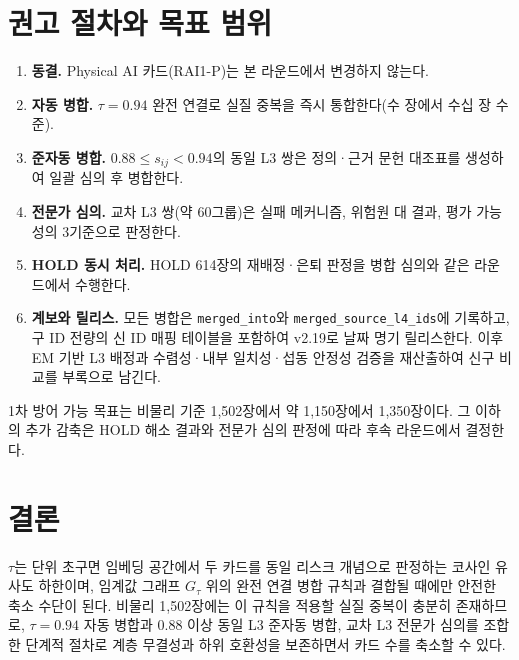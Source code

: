 \documentclass[11pt,a4paper]{article}
\begin{document}
\section{권고 절차와 목표 범위}

\begin{enumerate}
\item \textbf{동결.} Physical AI 카드(RAI1-P)는 본 라운드에서 변경하지 않는다.
\item \textbf{자동 병합.} $\tau=0.94$ 완전 연결로 실질 중복을 즉시 통합한다(수 장에서 수십 장 수준).
\item \textbf{준자동 병합.} $0.88 \leq s_{ij} < 0.94$의 동일 L3 쌍은 정의·근거 문헌 대조표를 생성하여 일괄 심의 후 병합한다.
\item \textbf{전문가 심의.} 교차 L3 쌍(약 60그룹)은 실패 메커니즘, 위험원 대 결과, 평가 가능성의 3기준으로 판정한다.
\item \textbf{HOLD 동시 처리.} HOLD 614장의 재배정·은퇴 판정을 병합 심의와 같은 라운드에서 수행한다.
\item \textbf{계보와 릴리스.} 모든 병합은 \texttt{merged\_into}와 \texttt{merged\_source\_l4\_ids}에 기록하고, 구 ID 전량의 신 ID 매핑 테이블을 포함하여 v2.19로 날짜 명기 릴리스한다. 이후 EM 기반 L3 배정과 수렴성·내부 일치성·섭동 안정성 검증을 재산출하여 신구 비교를 부록으로 남긴다.
\end{enumerate}

1차 방어 가능 목표는 비물리 기준 1{,}502장에서 약 1{,}150장에서 1{,}350장이다. 그 이하의 추가 감축은 HOLD 해소 결과와 전문가 심의 판정에 따라 후속 라운드에서 결정한다.

\section*{결론}

$\tau$는 단위 초구면 임베딩 공간에서 두 카드를 동일 리스크 개념으로 판정하는 코사인 유사도 하한이며, 임계값 그래프 $G_\tau$ 위의 완전 연결 병합 규칙과 결합될 때에만 안전한 축소 수단이 된다. 비물리 1{,}502장에는 이 규칙을 적용할 실질 중복이 충분히 존재하므로, $\tau=0.94$ 자동 병합과 $0.88$ 이상 동일 L3 준자동 병합, 교차 L3 전문가 심의를 조합한 단계적 절차로 계층 무결성과 하위 호환성을 보존하면서 카드 수를 축소할 수 있다.
\end{document}
